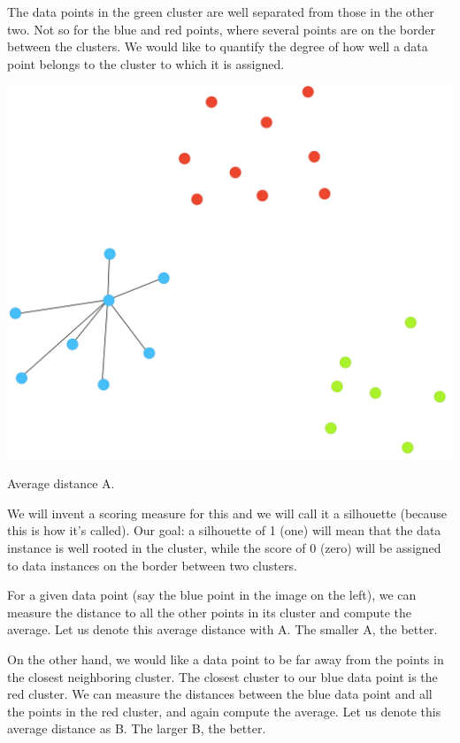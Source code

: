 The data points in the green cluster are well separated from those in the other two. Not so for the blue and red points, where several points are on the border between the clusters. We would like to quantify the degree of how well a data point belongs to the cluster to which it is assigned.

\begin{marginfigure}
    \centering
    \includegraphics[scale=0.25]{silhouette-pt1.png}
    \caption{Average distance A.}
\end{marginfigure}

We will invent a scoring measure for this and we will call it a silhouette (because this is how it's called). Our goal: a silhouette of 1 (one) will mean that the data instance is well rooted in the cluster, while the score of 0 (zero) will be assigned to data instances on the border between two clusters.

For a given data point (say the blue point in the image on the left), we can measure the distance to all the other points in its cluster and compute the average. Let us denote this average distance with A. The smaller A, the better.

On the other hand, we would like a data point to be far away from the points in the closest neighboring cluster. The closest cluster to our blue data point is the red cluster. We can measure the distances between the blue data point and all the points in the red cluster, and again compute the average. Let us denote this average distance as B. The larger B, the better.

